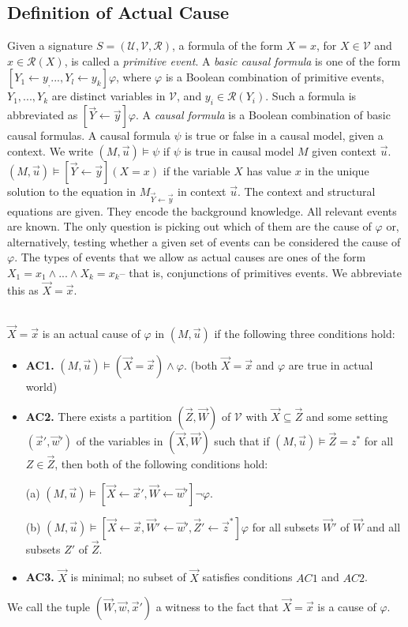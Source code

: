 \subsection{Definition of Actual Cause}
Given a signature $S= (\mathcal{U},\mathcal{V},\mathcal{R})$, a formula of the form $X =x$, for $X \in \mathcal{V}$ and $x \in \mathcal{R}(X)$, is called a \textit{primitive event}.
A \textit{basic causal formula} is one of the form $[Y_1 \leftarrow y_, ..., Y_l\leftarrow y_k]\varphi$, where $\varphi$ is a Boolean combination of primitive events, $Y_1,...,Y_k$ are distinct variables in $\mathcal{V}$, and $y_i \in \mathcal{R}(Y_i)$.
Such a formula is abbreviated as $[\vec{Y}\leftarrow\vec{y}]\varphi$.
A \textit{causal formula} is a Boolean combination of basic causal formulas.
A causal formula $\psi$ is true or false in a causal model, given a context.
We write $(M,\vec u)\models \psi$ if $\psi$ is true in causal model $M$ given context $\vec u$.
$(M,\vec u)\models [\vec Y\leftarrow \vec y](X=x)$ if the variable $X$ has value $x$ in the unique solution to the equation in $M_{\vec{Y} \leftarrow \vec{y}}$ in context $\vec u$.
The context and structural equations are given.
They encode the background knowledge.
All relevant events are known.
The only question is picking out which of them are the cause of $\varphi$ or, alternatively, testing whether a given set of events can be considered the cause of $\varphi$.
The types of events that we allow as actual causes are ones of the form $X_1 = x_1 \wedge ... \wedge X_k=x_k$-- that is, conjunctions of primitives events.
We abbreviate this as $\vec X = \vec x$.
\\
\\
\begin{definition}

    $\vec X = \vec x$ is an actual cause of $\varphi$ in $(M,\vec u)$ if the following three conditions hold:
    \begin{itemize}
        \item  \textbf{AC1.} $(M,\vec u)\models (\vec X = \vec x) \wedge \varphi$.
              (both $\vec X = \vec x$ and $\varphi$ are true in actual world)
        \item  \textbf{AC2. }There exists a partition $(\vec Z, \vec W)$ of $\mathcal{V}$ with $\vec X \subseteq \vec Z$ and some setting $(\vec x',\vec w')$ of the variables in $(\vec X,\vec W)$ such that if $(M,\vec u)\models \vec Z = z^*$ for all $Z\in \vec Z$, then both of the following conditions hold:

              (a) $(M,\vec u)\models[\vec X \leftarrow \vec x', \vec W \leftarrow \vec w']\neg \varphi$.

              (b) $(M,\vec u)\models[\vec X\leftarrow \vec x, \vec W' \leftarrow \vec w', \vec Z'\leftarrow \vec z^*]\varphi$ for all subsets $\vec W'$ of $\vec W$ and all subsets $Z'$ of $\vec Z$.

        \item  \textbf{AC3.} $\vec X$ is minimal; no subset of $\vec X$ satisfies conditions $AC1$ and $AC2$.
    \end{itemize}
\end{definition}
We call the tuple $(\vec W, \vec w,\vec x')$ a witness to the fact that $\vec X=\vec x$ is a cause of $\varphi$.

